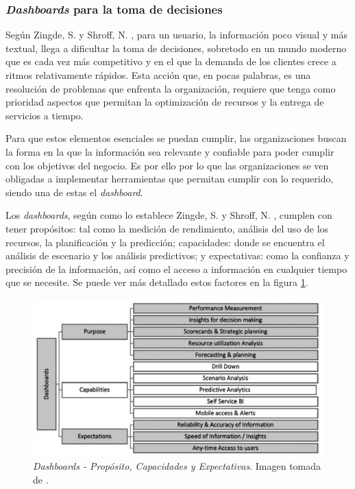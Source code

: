 \documentclass[spanish]{ieee_upb}
\begin{document}
\vspace{0.3cm}
\subsubsection{\textit{Dashboards} para la toma de decisiones}
Según Zingde, S. y Shroff, N. \cite{zingde2020role}, para un usuario, la información poco visual y más textual, llega a dificultar la toma de decisiones, sobretodo en un mundo moderno que es cada vez más competitivo y en el que la demanda de los clientes crece a ritmos relativamente rápidos. Esta acción que, en pocas palabras, es una resolución de problemas que enfrenta la organización, requiere que tenga como prioridad aspectos que permitan la optimización de recursos y la entrega de servicios a tiempo.

\vspace{0.3cm}
Para que estos elementos esenciales se puedan cumplir, las organizaciones buscan la forma en la que la información sea relevante y confiable para poder cumplir con los objetivos del negocio. Es por ello por lo que las organizaciones se ven obligadas a implementar herramientas que permitan cumplir con lo requerido, siendo una de estas el \textit{dashboard}.

\vspace{0.3cm}
Los \textit{dashboards}, según como lo establece Zingde, S. y Shroff, N. \cite{zingde2020role}, cumplen con tener propósitos: tal como la medición de rendimiento, análisis del uso de los recursos, la planificación y la predicción; capacidades: donde se encuentra el análisis de escenario y los análisis predictivos; y expectativas: como la confianza y precisión de la información, así como el acceso a información en cualquier tiempo que se necesite. Se puede ver más detallado estos factores en la figura \ref{fig:dashboard_pce}.

\begin{figure}[htpb] 
	\centering
	\includegraphics[width=0.8\linewidth]{img/dashboards_pce.jpg}
	\vspace{-1mm}
	\caption[Definición de Dashboard]{\textit{Dashboards - Propósito, Capacidades y Expectativas}. Imagen tomada de \cite{zingde2020role}.}
	\label{fig:dashboard_pce} 
\end{figure}
\end{document}
